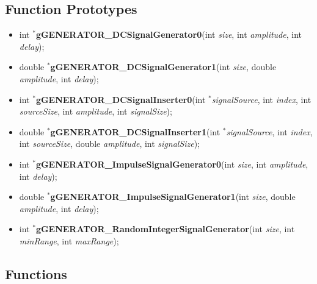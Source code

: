 \documentclass{article}
\begin{document}
\subsection{Function Prototypes}
{\renewcommand{\labelitemi}{$\triangleright$}
\begin{itemize}[noitemsep]
\footnotesize
\item int $^{\ast}$\textbf{gGENERATOR\_DCSignalGenerator0}(int \textit{size}, int \textit{amplitude}, int \textit{delay});
\item double $^{\ast}$\textbf{gGENERATOR\_DCSignalGenerator1}(int \textit{size}, double \textit{amplitude}, int \textit{delay});
\item int $^{\ast}$\textbf{gGENERATOR\_DCSignalInserter0}(int $^{\ast}$\textit{signalSource}, int \textit{index}, int \textit{sourceSize}, int \textit{amplitude}, int \textit{signalSize});
\item  double $^{\ast}$\textbf{gGENERATOR\_DCSignalInserter1}(int $^{\ast}$\textit{signalSource}, int \textit{index}, int \textit{sourceSize}, double \textit{amplitude}, int \textit{signalSize});
\item int $^{\ast}$\textbf{gGENERATOR\_ImpulseSignalGenerator0}(int \textit{size}, int \textit{amplitude}, int \textit{delay});
\item double $^{\ast}$\textbf{gGENERATOR\_ImpulseSignalGenerator1}(int \textit{size}, double \textit{amplitude}, int \textit{delay});
\item int $^{\ast}$\textbf{gGENERATOR\_RandomIntegerSignalGenerator}(int \textit{size}, int \textit{minRange}, int \textit{maxRange});
\normalsize
\end{itemize}
\cleardoublepage
\subsection{Functions}

}
\end{document}
